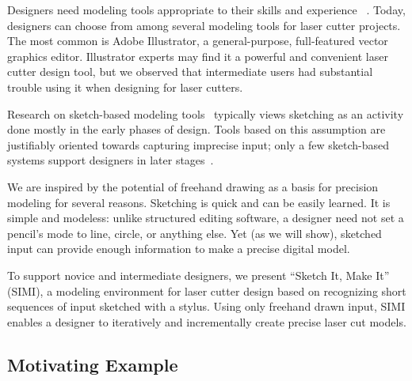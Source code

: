 \documentclass{article}
\begin{document}
Designers need modeling tools appropriate to their skills and
experience ~\cite{lipson-homefactory}. Today, designers can choose
from among several modeling tools for laser cutter projects. The most
common is Adobe Illustrator, a general-purpose, full-featured vector
graphics editor. Illustrator experts may find it a powerful and
convenient laser cutter design tool, but we observed that intermediate
users had substantial trouble using it when designing for laser
cutters.

Research on sketch-based modeling tools~\cite{johnson-sketch-review}
typically views sketching as an activity done mostly in the early
phases of design. Tools based on this assumption are justifiably
oriented towards capturing imprecise input; only a few sketch-based
systems support designers in later
stages~\cite{mori-plushie,saul-sketch-chair,naya-parsketch}.

We are inspired by the potential of freehand drawing as a basis for
precision modeling for several reasons. Sketching is quick and can be
easily learned. It is simple and modeless: unlike structured editing
software, a designer need not set a pencil's mode to line, circle, or
anything else. Yet (as we will show), sketched input can provide
enough information to make a precise digital model.

To support novice and intermediate designers, we present ``Sketch It,
Make It'' (SIMI), a modeling environment for laser cutter design based
on recognizing short sequences of input sketched with a stylus. Using
only freehand drawn input, SIMI enables a designer to iteratively and
incrementally create precise laser cut models.

\subsection{Motivating Example}
\end{document}
